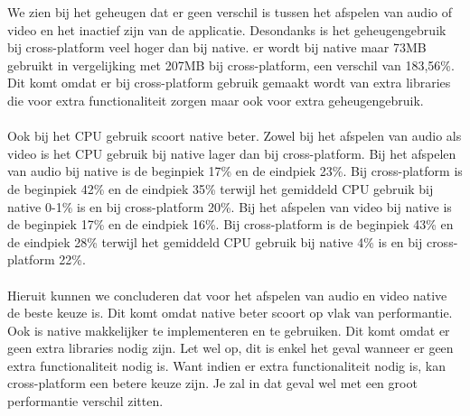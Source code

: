 We zien bij het geheugen dat er geen verschil is tussen het afspelen van audio of video 
en het inactief zijn van de applicatie. Desondanks is het geheugengebruik bij cross-platform veel 
hoger dan bij native. er wordt bij native maar 73MB gebruikt in vergelijking met 207MB 
bij cross-platform, een verschil van 183,56\%. 
Dit komt omdat er bij cross-platform gebruik gemaakt wordt van extra libraries die voor 
extra functionaliteit zorgen maar ook voor extra geheugengebruik.
\\\\
Ook bij het CPU gebruik scoort native beter. Zowel bij het afspelen van audio als video 
is het CPU gebruik bij native lager dan bij cross-platform. Bij het afspelen van audio bij 
native is de beginpiek 17\% en de eindpiek 23\%. Bij cross-platform is de 
beginpiek 42\% en de eindpiek 35\% terwijl het gemiddeld CPU gebruik bij native 0-1\% is en bij
cross-platform 20\%. Bij het afspelen van video bij native is de beginpiek 17\% en de eindpiek 16\%.
Bij cross-platform is de beginpiek 43\% en de eindpiek 28\% terwijl het gemiddeld CPU gebruik bij
native 4\% is en bij cross-platform 22\%. 
\\\\
Hieruit kunnen we concluderen dat voor het afspelen van audio en video native de beste keuze is.
Dit komt omdat native beter scoort op vlak van performantie. Ook is native makkelijker te implementeren
en te gebruiken. Dit komt omdat er geen extra libraries nodig zijn. Let wel op, dit is enkel het geval
wanneer er geen extra functionaliteit nodig is. Want indien er extra functionaliteit nodig is, kan
cross-platform een betere keuze zijn. Je zal in dat geval wel met een groot performantie verschil zitten.
















